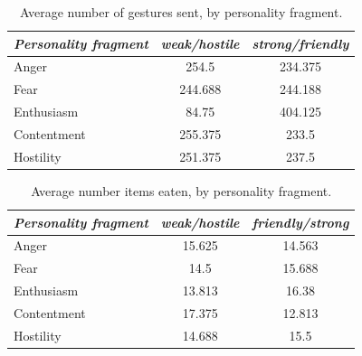 \begin{table}
	\centering
	\begin{tabular}{ l | c | c }
		\emph{Personality fragment} & \emph{weak/hostile} & \emph{ strong/friendly} \\
		\hline
		Anger & 254.5 & 234.375\\
		Fear & 244.688 & 244.188\\
		Enthusiasm & 84.75 & 404.125\\
		Contentment & 255.375 & 233.5\\
		Hostility & 251.375 & 237.5\\
		\hline
	\end{tabular}
	\caption{Average number of gestures sent, by personality fragment.}
	\label{tab:numGesturesAvg}
\end{table}

\begin{table}
	\centering
	\begin{tabular}{ l | c | c }
		\emph{Personality fragment} & \emph{weak/hostile} & \emph{friendly/strong} \\
		\hline
		Anger & 15.625 & 14.563\\
		Fear & 14.5 & 15.688\\
		Enthusiasm & 13.813 & 16.38\\
		Contentment & 17.375 & 12.813\\
		Hostility & 14.688 & 15.5\\
		\hline
	\end{tabular}
	\caption{Average number items eaten, by personality fragment.}
	\label{tab:numMealsAvg}
\end{table}
